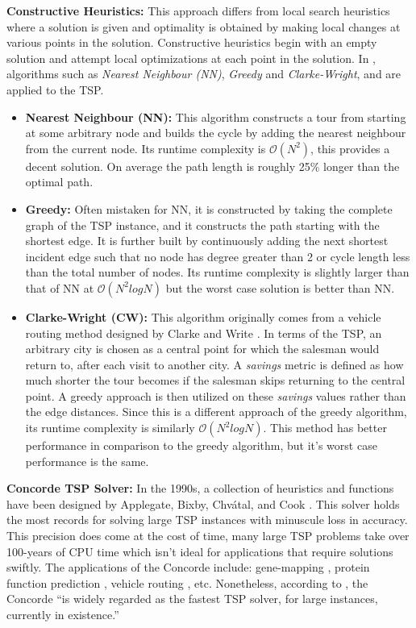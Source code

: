 \documentclass[]{UCD_CS_FYP_Report}
\begin{document}
\textbf{Constructive Heuristics:}
This approach differs from local search heuristics where a solution is given and optimality is obtained by making local changes at various points in the solution. Constructive heuristics begin with an empty solution and attempt local optimizations at each point in the solution. In \cite{JohnMcGe97}, algorithms such as \textit{Nearest Neighbour (NN)}, \textit{Greedy} and \textit{Clarke-Wright}, and are applied to the TSP. 
\begin{itemize}
  \item \textbf{Nearest Neighbour (NN): }This algorithm constructs a tour from starting at some arbitrary node and builds the cycle by adding the nearest neighbour from the current node. Its runtime complexity is $\mathcal{O}(N^2)$, this provides a decent solution. On average the path length is roughly 25\% longer than the optimal path.
  \item \textbf{Greedy: }Often mistaken for NN, it is constructed by taking the complete graph of the TSP instance, and it constructs the path starting with the shortest edge. It is further built by continuously adding the next shortest incident edge such that no node has degree greater than 2 or cycle length less than the total number of nodes. Its runtime complexity is slightly larger than that of NN at $\mathcal{O}(N^2logN)$ but the worst case solution is better than NN.
  \item \textbf{Clarke-Wright (CW): }This algorithm originally comes from a vehicle routing method designed by Clarke and Write \cite{Clarke:1964:SVC:2769344.2769349}. In terms of the TSP, an arbitrary city is chosen as a central point for which the salesman would return to, after each visit to another city. A \textit{savings} metric is defined as how much shorter the tour becomes if the salesman skips returning to the central point. A greedy approach is then utilized on these \textit{savings} values rather than the edge distances. Since this is a different approach of the greedy algorithm, its runtime complexity is similarly $\mathcal{O}(N^2logN)$. This method has better performance in comparison to the greedy algorithm, but it's worst case performance is the same.
\end{itemize}

\textbf{Concorde TSP Solver:}
In the 1990s, a collection of heuristics and functions have been designed by Applegate, Bixby, Chvátal, and Cook \cite{davidapplegate2007}. This solver holds the most records for solving large TSP instances with minuscule loss in accuracy. This precision does come at the cost of time, many large TSP problems take over 100-years of CPU time which isn't ideal for applications that require solutions swiftly. The applications of the Concorde include: gene-mapping \cite{10.1093/jhered/esg012}, protein function prediction \cite{Johnson2006}, vehicle routing \cite{ApplegateVPR}, etc. Nonetheless, according to \cite{MULDER2003827}, the Concorde “is widely regarded as the fastest TSP solver, for large instances, currently in existence.”
\end{document}
